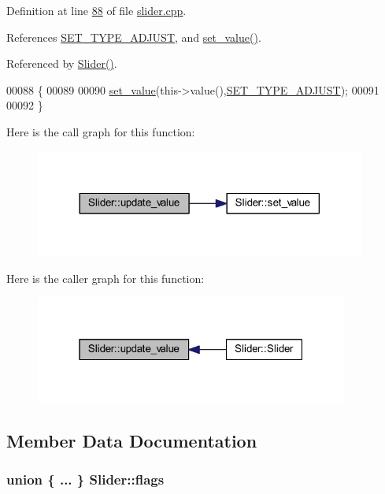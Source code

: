 Definition at line \hyperlink{a00046_source_l00088}{88} of file \hyperlink{a00046_source}{slider.\+cpp}.



References \hyperlink{a00034_source_l00049}{S\+E\+T\+\_\+\+T\+Y\+P\+E\+\_\+\+A\+D\+J\+U\+S\+T}, and \hyperlink{a00046_source_l00102}{set\+\_\+value()}.



Referenced by \hyperlink{a00046_source_l00014}{Slider()}.


\begin{DoxyCode}
00088                          \{
00089 
00090     \hyperlink{a00024_ae3010d3de02715db2f443560d7d2a27b}{set\_value}(this->value(),\hyperlink{a00034_a16b6b7b5ad68ec0dd62a3c9e97f88adb}{SET\_TYPE\_ADJUST});
00091 
00092 \}
\end{DoxyCode}


Here is the call graph for this function\+:
\nopagebreak
\begin{figure}[H]
\begin{center}
\leavevmode
\includegraphics[width=308pt]{dc/de2/a00024_a4f62a01554ee8d975abe0cb136937695_cgraph}
\end{center}
\end{figure}




Here is the caller graph for this function\+:
\nopagebreak
\begin{figure}[H]
\begin{center}
\leavevmode
\includegraphics[width=292pt]{dc/de2/a00024_a4f62a01554ee8d975abe0cb136937695_icgraph}
\end{center}
\end{figure}




\subsection{Member Data Documentation}
\hypertarget{a00024_ade6449558d429b66e5ed1381bc9b9060}{
\subsubsection[{flags}]{\setlength{\rightskip}{0pt plus 5cm}union \{ ... \}  Slider\+::flags}}\label{a00024_ade6449558d429b66e5ed1381bc9b9060}


